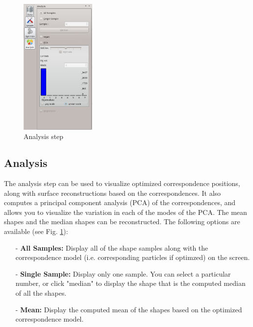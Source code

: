 \documentclass[letterpaper,12pt]{article}   %
\begin{document}
\begin{figure}
	\centering
	\includegraphics[width=0.33\textwidth]{figs_v2/analysis.png}
	\caption{Analysis step}
	\label{fig:analysis}
\end{figure}%


\subsection{Analysis}

The analysis step can be used to visualize optimized correspondence positions, along with surface reconstructions based on the correspondences. It also computes a principal component analysis (PCA) of the correspondences, and allows you to visualize the variation in each of the modes of the PCA. The mean shapes and the median shapes can be reconstructed. %
The following options are available (see Fig. \ref{fig:analysis}):

\begin{itemize}
\item[-] \textbf{All Samples:} Display all of the shape samples along with the correspondence model (i.e. corresponding particles if optimzed) on the screen.
\item[-] \textbf{Single Sample:} Display only one sample. You can select a particular number, or click "median" to display the shape that is the computed median of all the shapes.
\item[-] \textbf{Mean:} Display the computed mean of the shapes based on the optimized correspondence model.
\end{itemize}
\end{document}
